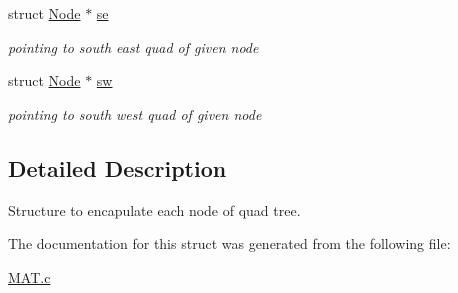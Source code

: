 \begin{DoxyCompactItemize}
\mbox{\label{structNode_a6d8a9792c1f4da8f3b6fe05e1482a91f}} 
struct \hyperlink{structNode}{Node} $\ast$ \hyperlink{structNode_a6d8a9792c1f4da8f3b6fe05e1482a91f}{se}
\begin{DoxyCompactList}\small\item\em pointing to south east quad of given node \end{DoxyCompactList}\item 
\mbox{\label{structNode_a869a287b8df2c273943709164c2ff7df}} 
struct \hyperlink{structNode}{Node} $\ast$ \hyperlink{structNode_a869a287b8df2c273943709164c2ff7df}{sw}
\begin{DoxyCompactList}\small\item\em pointing to south west quad of given node \end{DoxyCompactList}\end{DoxyCompactItemize}


\subsection{Detailed Description}
Structure to encapulate each node of quad tree. 

The documentation for this struct was generated from the following file\+:\begin{DoxyCompactItemize}
\item 
\hyperlink{MAT_8c}{M\+A\+T.\+c}\end{DoxyCompactItemize}
